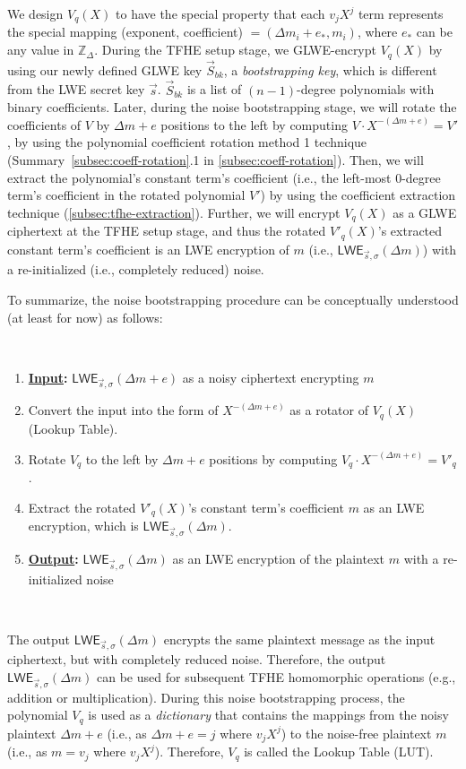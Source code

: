 We design $V_q(X)$ to have the special property that each $v_{j}X^{j}$ term represents the special mapping (exponent, coefficient) $= (\Delta m_i + e_{*}, m_i)$, where $e_*$ can be any value in $\mathbb{Z}_{\Delta}$. During the TFHE setup stage, we GLWE-encrypt $V_q(X)$ by using our newly defined GLWE key $\vec{S}_{bk}$, a \textit{bootstrapping key}, which is different from the LWE secret key $\vec{s}$. $\vec{S}_{bk}$ is a list of $(n-1)$-degree polynomials with binary coefficients. Later, during the noise bootstrapping stage, we will rotate the coefficients of $V$ by $\Delta m + e$ positions to the left by computing $V \cdot X^{-(\Delta m + e)} = V'$, by using the polynomial coefficient rotation method 1 technique (Summary~\ref*{subsec:coeff-rotation}.1 in \autoref{subsec:coeff-rotation}). Then, we will extract the polynomial's constant term's coefficient (i.e., the left-most 0-degree term's coefficient in the rotated polynomial $V'$) by using the coefficient extraction technique (\autoref{subsec:tfhe-extraction}). Further, we will encrypt $V_q(X)$ as a GLWE ciphertext at the TFHE setup stage, and thus the rotated $V'_q(X)$'s extracted constant term's coefficient is an LWE encryption of $m$ (i.e., $\textsf{LWE}_{\vec{s}, \sigma}(\Delta m)$) with a re-initialized (i.e., completely reduced) noise. 

To summarize, the noise bootstrapping procedure can be conceptually understood (at least for now) as follows: 

$ $

\begin{enumerate}
\item \textbf{\underline{Input}:} $\textsf{LWE}_{\vec{s}, \sigma}(\Delta m + e)$ as a noisy ciphertext encrypting $m$
\item Convert the input into the form of $X^{-(\Delta m + e)}$ as a rotator of $V_q(X)$ (Lookup Table).
\item Rotate $V_q$ to the left by $\Delta m + e$ positions by computing $V_q \cdot X^{-(\Delta m + e)} = V'_q$.
\item Extract the rotated $V'_q(X)$'s constant term's coefficient $m$ as an LWE encryption, which is $\textsf{LWE}_{\vec{s}, \sigma}(\Delta m)$.
\item \textbf{\underline{Output}:} $\textsf{LWE}_{\vec{s}, \sigma}(\Delta m)$ as an LWE encryption of the plaintext $m$ with a re-initialized noise
\end{enumerate}

$ $

The output $\textsf{LWE}_{\vec{s}, \sigma}(\Delta m)$ encrypts the same plaintext message as the input ciphertext, but with completely reduced noise. Therefore, the output $\textsf{LWE}_{\vec{s}, \sigma}(\Delta m)$ can be used for subsequent TFHE homomorphic operations (e.g., addition or multiplication). During this noise bootstrapping process, the polynomial $V_q$ is used as a \textit{dictionary} that contains the mappings from the noisy plaintext $\Delta m + e$ (i.e., as $\Delta m + e = j$ where $v_jX^j$) to the noise-free plaintext $m$ (i.e., as $m = v_j$ where $v_jX^j$). Therefore, $V_q$ is called the Lookup Table (LUT). 

